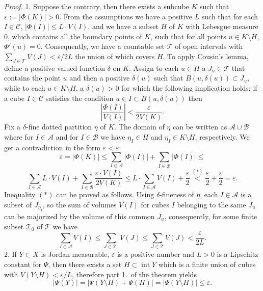 \documentclass{article}
\newcommand{\proof}[1]{\textit{Proof. }#1}
\newcommand{\ir}{\mathop{\mathrm{int}}\nolimits}
\newcommand{\ee}{\varepsilon}
\begin{document}
\proof{ 1. Suppose the contrary, then there exists a subcube $K$ such
that $\varepsilon:=|\Phi(K)|>0$. From the assumptions we have a
positive $L$ such that for each $I\in\mathcal{C}$, $|\Phi(I)|\le
L\cdot V(I)$, and we have a subset $H$ of $K$ with Lebesgue
measure $0$, which contains all the boundary points of $K$, such
that for all points $u\in K\setminus H$, $\Phi'(u)=0$.
Consequently, we have a countable set $\mathcal{T}$ of open
intervals with $\sum_{J\in\mathcal{T}}V(J)<\varepsilon/2L$ the
union of which covers $H$. To apply Cousin's lemma, define a
positive valued function $\delta$ on $K$. Assign to each $u\in H$
a $J_u\in \mathcal{T}$ that contains the point $u$ and then a
positive $\delta(u)$ such that $B(u,\delta(u))\subset J_u$, while
to each $u\in K\setminus H$, a $\delta(u)>0$ for which the
following implication holds: if a cube $I\in\mathcal{C}$ satisfies
the condition $u\in I\subset B(u,\delta(u))$ then
\[\left|\frac{\Phi(I)}{V(I)}\right|<\frac{\varepsilon}{2V(K)}.\]
Fix a $\delta$-fine dotted partition $\eta$ of $K$. The domain of
$\eta$ can be written as $\mathcal{A}\cup\mathcal{B}$ where for
$I\in \mathcal{A}$ and for $I\in \mathcal{B}$ we have $\eta_I\in
H$ and $\eta_I\in K\setminus H$, respectively. We get a
contradiction in the form $\varepsilon<\varepsilon$:
\[\varepsilon=|\Phi(K)|\le\sum_{I\in\mathcal{A}}|\Phi(I)|+
\sum_{I\in\mathcal{B}}|\Phi(I)|\le\]
\begin{equation}
\sum_{I\in\mathcal{A}}L\cdot V(I)+
\sum_{I\in\mathcal{B}}\frac{\ee\cdot V(I)}{2V(K)}\le
L\cdot\sum_{I\in\mathcal{A}}V(I)+\frac{\ee}{2}\stackrel{(*)}{<}
\frac{\ee}{2}+\frac{\ee}{2}=\ee.
\end{equation}
Inequality $(*)$ can be proved as follows. Using $\delta$-fineness
of $\eta$, each $I\in\mathcal{A}$ is a subset of $J_{\eta_I}$, so
the sum of volumes $V(I)$ for cubes $I$ belonging to the same
$J_u$ can be majorized by the volume of this common $J_u$,
consequently, for some finite subset $\mathcal{T}_0$ of
$\mathcal{T}$ we have
\[\sum_{I\in\mathcal{A}}V(I)\le\sum_{J\in\mathcal{T}_0}V(J)\le
\sum_{J\in\mathcal{T}}V(J) <\frac{\varepsilon}{2L}.\]
2. If
$Y\subset X$ is Jordan measurable, $\ee$ is a positive number and
$L>0$ is a Lipschitz constant for $\Psi$, then there exists a set
$H\subset\ir Y$ which is a finite union of cubes with
$V(Y\setminus H)<\ee/L$, therefore part 1.~of the theorem yields
\[|\Psi(Y)|=|\Psi(Y\setminus H)+\Psi(H)|=|\Psi(Y\setminus
H)|\le\ee.\]%
}%
\end{document}
